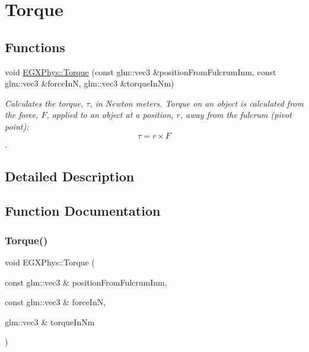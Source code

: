 \hypertarget{group___e_g_x_phys-_kinetics-_torque}{}\section{Torque}
\label{group___e_g_x_phys-_kinetics-_torque}
\subsection*{Functions}
\begin{DoxyCompactItemize}
\item 
void \mbox{\hyperlink{group___e_g_x_phys-_kinetics-_torque_ga12a787853cab88d40412c8290ca41c61}{E\+G\+X\+Phys\+::\+Torque}} (const glm\+::vec3 \&position\+From\+Fulcrum\+Inm, const glm\+::vec3 \&force\+InN, glm\+::vec3 \&torque\+In\+Nm)
\begin{DoxyCompactList}\small\item\em Calculates the torque, $\tau$, in Newton meters. Torque on an object is calculated from the force, $F$, applied to an object at a position, $r$, away from the fulcrum (pivot point)\+: \[\tau=r \times F \]. \end{DoxyCompactList}\end{DoxyCompactItemize}


\subsection{Detailed Description}


\subsection{Function Documentation}
\mbox{\label{group___e_g_x_phys-_kinetics-_torque_ga12a787853cab88d40412c8290ca41c61}} 
\subsubsection{\texorpdfstring{Torque()}{Torque()}}
{\footnotesize\ttfamily void E\+G\+X\+Phys\+::\+Torque (\begin{DoxyParamCaption}\item[{const glm\+::vec3 \&}]{position\+From\+Fulcrum\+Inm,  }\item[{const glm\+::vec3 \&}]{force\+InN,  }\item[{glm\+::vec3 \&}]{torque\+In\+Nm }\end{DoxyParamCaption})}



